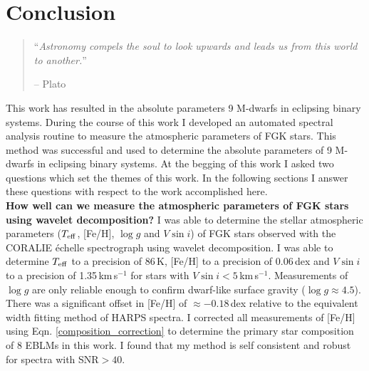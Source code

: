 \chapter{Conclusion}

\begin{quote}
``{\it Astronomy compels the soul to look upwards and leads us from this world to another.}''

-- Plato
\end{quote}

This work has resulted in the absolute parameters 9 M-dwarfs in eclipsing binary systems. During the course of this work I developed an automated spectral analysis routine to measure the atmospheric parameters of FGK stars. This method was successful and used to determine the absolute parameters of 9 M-dwarfs in eclipsing binary systems.  At the begging of this work I asked two questions which set the themes of this work. In the following sections I answer these questions with respect to the work accomplished here.  \\

\noindent  \textbf{How well can we measure the atmospheric parameters of FGK stars using wavelet decomposition?}  I was able to determine the stellar atmospheric parameters ($T_{\rm eff}$, [Fe/H], $\log g$ and $V \sin i$) of FGK stars observed with the CORALIE \'{e}chelle spectrograph using wavelet decomposition. I was able to determine $T_{\rm eff}$ to a precision of 86\,K, [Fe/H] to a precision of 0.06\,dex and $V \sin i$ to a precision of 1.35\,km\,s$^{-1}$ for stars with $V \sin i  < 5$\,km\,s$^{-1}$. Measurements of $\log g$ are only reliable enough to confirm dwarf-like surface gravity ($\log g \approx 4.5$). There was a significant offset in [Fe/H] of $\approx - 0.18$\,dex relative to the equivalent width fitting method of HARPS spectra. I corrected all measurements of [Fe/H] using Eqn. \ref{composition_correction} to determine the primary star composition of 8 EBLMs in this work. I found that my method is self consistent and robust for spectra with SNR$>40$.




